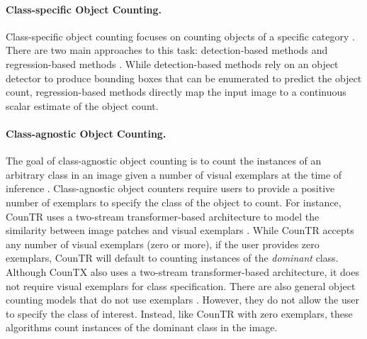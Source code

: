 \documentclass{bmvc2k}
\begin{document}
\paragraph{Class-specific Object Counting.}
Class-specific object counting focuses on counting objects of a specific category \cite{10.1007/978-3-031-19821-2_11, artetaCountingWild2016, mundhenkLargeContextualDataset2016a, doi:10.1080/21681163.2016.1149104}. There are two main approaches to this task: detection-based methods \cite{Barinova2010OnDO, 10.1007/s11263-011-0439-x, Hsieh2017DroneBasedOC} and regression-based methods \cite{Arteta2014InteractiveOC, artetaCountingWild2016, Cho1999ANC, Kong2006AVI, Lempitsky2010LearningTC, Marana1997EstimationOC, doi:10.1080/21681163.2016.1149104}. While detection-based methods rely on an object detector to produce bounding boxes that can be enumerated to predict the object count, regression-based methods directly map the input image to a continuous scalar estimate of the object count.





\paragraph{Class-agnostic Object Counting.}  The goal of class-agnostic object counting is to count the instances of an arbitrary class in an image given a number of visual exemplars at the time of inference \cite{Arteta2014InteractiveOC, Gong2022ClassAgnosticOC, Liu2022CounTRTG, luClassAgnosticCounting2019, 10.1007/978-3-031-20044-1_20, m_Ranjan-etal-CVPR21, Shi2022RepresentCA, yangClassagnosticFewshotObject2021, You_2023_WACV, low_shot, Lin_2022_BMVC}. Class-agnostic object counters require users to provide a positive number of exemplars to specify the class of the object to count. For instance, CounTR uses a two-stream transformer-based architecture to model the similarity between image patches and visual exemplars \cite{Liu2022CounTRTG}. While CounTR accepts any number of visual exemplars (zero or more), if the user provides zero exemplars, CounTR will default to counting instances of the {\em dominant} class. Although CounTX also uses a two-stream transformer-based architecture, it does not require visual exemplars for class specification. 
There are also general object counting models that do not use exemplars \cite{Hobley2022LearningTC, 10.1007/978-3-031-26316-3_5}. However, they do not allow the user to specify the class of interest. Instead, like CounTR with zero exemplars, these algorithms count instances of the dominant class in the image. 
\end{document}
